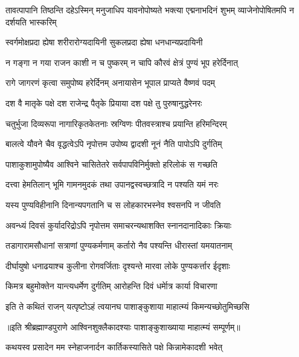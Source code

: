 \threelineshloka
{तावत्पापानि तिष्ठन्ति दहेऽस्मिन् मनुजाधिप}
{यावनोपोष्यते भक्त्या एद्मनाभदिनं शुभम्}
{व्याजेनोपोषितमपि न दर्शयति भास्करिम्} %

\twolineshloka
{स्वर्गमोक्षप्रदा ह्येषा शरीरारोग्यदायिनी}
{सुकलप्रदा ह्येषा धनधान्यप्रदायिनी} %

\twolineshloka
{न गङ्गा न गया राजन काशी न च पुष्करम्}
{न चापि कौरवं क्षेत्रं पुण्यं भूप हरेर्दिनात्} %

\twolineshloka
{रागे जागरणं कृत्वा समुपोष्य हरेर्दिनम्}
{अनायासेन भूपाल प्राप्यते वैष्णवं पदम्} %

\twolineshloka
{दश वै मातृके पक्षे दश राजेन्द्र पैतृके}
{प्रियाया दश पक्षे तु पुरुषानुद्धरेनरः} %

\twolineshloka
{चतुर्भुजा दिव्यरूपा नागारिकृतकेतनाः}
{स्रग्विणः पीतवस्त्राश्च प्रयान्ति हरिमन्दिरम्} %

\twolineshloka
{बालत्वे यौवने चैव वृद्धत्वेऽपि नृपोत्तम}
{उपोष्य द्वादशी नूनं नैति पापोऽपि दुर्गतिम्} %

\twolineshloka
{पाशाकुशामुपोष्यैव आश्विने चासितेतरे}
{सर्वपापविनिर्मुक्तो हरिलोकं स गच्छति} %

\twolineshloka
{दत्त्वा हेमतिलान् भूमि गामनमुदकं तथा}
{उपानद्वस्वच्छत्रादि न पश्यति यमं नरः} %

\twolineshloka
{यस्य पुण्यविहीनानि दिनान्यपगतानि च}
{स लोहकारभस्नेव श्वसनपि न जीवति} %

\twolineshloka
{अवन्ध्यं दिवसं कुर्यादरिद्रोऽपि नृपोत्तम}
{समाचरन्यथाशक्ति स्नानदानादिकाः क्रियाः} %

\twolineshloka
{तडागारामसौधानां सत्राणां पुण्यकर्मणाम्}
{कर्तारो नैव पश्यन्ति धीरास्तां यमयातनाम्} %

\twolineshloka
{दीर्घायुषो धनाढयाश्च कुलीना रोगवर्जिताः}
{दृश्यन्ते मारवा लोके पुण्यकर्त्तार ईदृशाः} %

\twolineshloka
{किमत्र बहुमोक्तेन यान्त्यधर्मेण दुर्गतिम्}
{आरोहन्ति दिवं धर्मेात्र कार्या विचारणा} %

\twolineshloka
{इति ते कथितं राजन् यत्पृष्टोऽहं त्वयानघ}
{पाशाङ्कुशाया माहात्म्यं किमन्यच्छोतुमिच्छसि} %

॥इति श्रीब्रह्माण्डपुराणे आश्विनशुक्लैकादश्याः पाशाङ्कुशाख्याया माहात्म्यं सम्पूर्णम्॥



\twolineshloka
{कथयस्व प्रसादेन मम स्नेहाजनार्दन}
{कार्तिकस्यासिते पक्षे किन्नामेकादशी भवेत्} %

